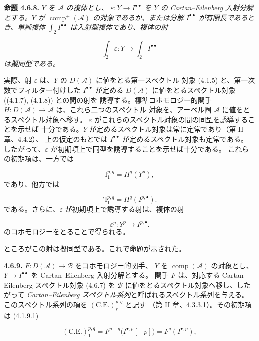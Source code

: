 \clearpage
{}%
\begingroup\small\setlength{\parskip}{0pt}\setlength{\emergencystretch}{1.5em}
\setlength{\abovedisplayskip}{4pt plus 2pt minus 2pt}%
\setlength{\belowdisplayskip}{4pt plus 2pt minus 2pt}%

\noindent\textbf{命題 4.6.8.}\quad
\textit{$Y$ を $\mathcal A$ の複体とし、
$\varepsilon\colon Y\longrightarrow I^{\bullet\bullet}$ を $Y$ の
Cartan--Eilenberg 入射分解とする。$Y$ が
$\operatorname{comp}^{+}(\mathcal A)$ の対象であるか、または分解
$I^{\bullet\bullet}$ が有限長であるとき、単純複体
$\int_2 I^{\bullet\bullet}$ は入射型複体であり、複体の射}

\[
\textit{$\int_2\varepsilon\colon
Y\longrightarrow\int_2 I^{\bullet\bullet}$}
\]
\textit{は擬同型である。}

実際、射 $\varepsilon$ は、$Y$ の $D(\mathcal A)$ に値をとる第一スペクトル
対象 (4.1.5) と、第一次数でフィルター付けした $I^{\bullet\bullet}$ が定める
$D(\mathcal A)$ に値をとるスペクトル対象 ((4.1.7), (4.1.8)) との間の射を
誘導する。標準コホモロジー的関手
$H\colon D(\mathcal A)\longrightarrow\mathcal A$ は、これら二つのスペクトル
対象を、アーベル圏 $\mathcal A$ に値をとるスペクトル対象へ移す。
$\varepsilon$ がこれらのスペクトル対象の間の同型を誘導することを示せば
十分である。$Y$ が定めるスペクトル対象は常に定常であり（第 II 章、4.4.2）、
上の仮定のもとでは $I^{\bullet\bullet}$ が定めるスペクトル対象も定常である。
したがって、$\varepsilon$ が初期項上で同型を誘導することを示せば十分である。
これらの初期項は、一方では

\[
\mathrm I_1^{p,q}=H^q(Y^p),
\]
であり、他方では

\[
{}'\mathrm I_1^{p,q}=H^q(I^{p,\bullet}).
\]
である。さらに、$\varepsilon$ が初期項上で誘導する射は、複体の射

\[
\varepsilon^p\colon Y^p\longrightarrow I^{p,\bullet}.
\]
のコホモロジーをとることで得られる。

ところがこの射は擬同型である。これで命題が示された。

\medskip\noindent\textbf{4.6.9.}\quad
$F\colon D(\mathcal A)\longrightarrow\mathcal B$ をコホモロジー的関手、
$Y$ を $\operatorname{comp}(\mathcal A)$ の対象とし、
$Y\longrightarrow I^{\bullet\bullet}$ を Cartan--Eilenberg 入射分解とする。
関手 $F$ は、対応する Cartan--Eilenberg スペクトル対象 (4.6.7) を
$\mathcal B$ に値をとるスペクトル対象へ移し、したがって
\emph{Cartan--Eilenberg スペクトル系列}と呼ばれるスペクトル系列を与える。
このスペクトル系列の項を $(\mathrm{C.E.})_r^{p,q}$ と記す
（第 II 章、4.3.3.1）。その初期項は (4.1.9.1)

\[
(\mathrm{C.E.})_1^{p,q}
=F^{p+q}\bigl(I^{\bullet,p}[-p]\bigr)
=F^q(I^{\bullet,p}),
\]
\endgroup
